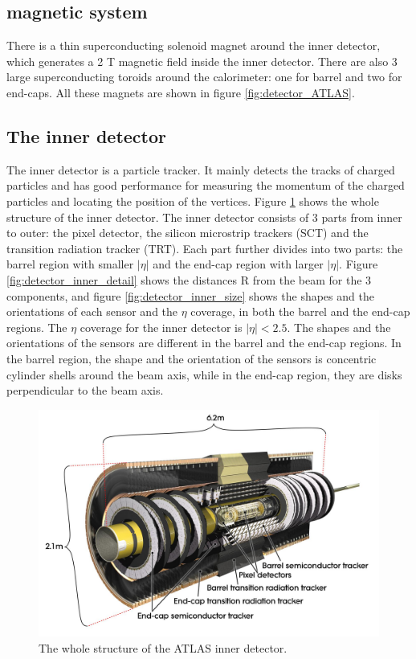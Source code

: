 \subsection{magnetic system}
There is a thin superconducting solenoid magnet around the inner detector, which generates a 2 T magnetic field inside the inner detector.
There are also 3 large superconducting toroids around the calorimeter: one for barrel and two for end-caps.
All these magnets are shown in figure \ref{fig:detector_ATLAS}.

\subsection{The inner detector}
The inner detector is a particle tracker.
It mainly detects the tracks of charged particles and has good performance for measuring the momentum of the charged particles and locating the position of the vertices.
Figure \ref{fig:detector_inner_whole} shows the whole structure of the inner detector.
The inner detector consists of 3 parts from inner to outer: the pixel detector, the silicon microstrip trackers (SCT) and the transition radiation tracker (TRT).
Each part further divides into two parts: the barrel region with smaller $|\eta|$ and the end-cap region with larger $|\eta|$.
Figure \ref{fig:detector_inner_detail} shows the distances R from the beam for the 3 components, and figure \ref{fig:detector_inner_size} shows the shapes and the orientations of each sensor and the $\eta$ coverage, in both the barrel and the end-cap regions.
The $\eta$ coverage for the inner detector is $|\eta| < 2.5$.
The shapes and the orientations of the sensors are different in the barrel and the end-cap regions.
In the barrel region, the shape and the orientation of the sensors is concentric cylinder shells around the beam axis, while in the end-cap region, they are disks perpendicular to the beam axis.
\begin{figure}
\centering
\includegraphics[width=\textwidth]{data/photo/inner_whole.jpg}
\caption{The whole structure of the ATLAS inner detector. \cite{inner_photo}}
\label{fig:detector_inner_whole}
\end{figure}
